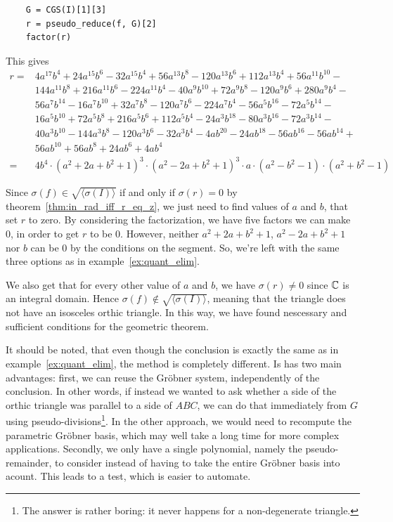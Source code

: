 \begin{example}
  \begin{verbatim}
    G = CGS(I)[1][3]
    r = pseudo_reduce(f, G)[2]
    factor(r)
  \end{verbatim}
  This gives
  \begin{align*}
    r = &4 a^{17} b^4 + 24 a^{15} b^6 - 32 a^{15} b^4 + 56 a^{13} b^8 - 120 a^{13} b^6 + 112 a^{13} b^4 + 56 a^{11} b^{10} - \\
        &144 a^{11} b^8 + 216 a^{11} b^6 - 224 a^{11} b^4 - 40 a^9 b^{10} + 72 a^9 b^8 - 120 a^9 b^6 + 280 a^9 b^4 - \\
        &56 a^7 b^{14} - 16 a^7 b^{10} + 32 a^7 b^8 - 120 a^7 b^6 - 224 a^7 b^4 - 56 a^5 b^{16} - 72 a^5 b^{14} - \\
        &16 a^5 b^{10} + 72 a^5 b^8 + 216 a^5 b^6 + 112 a^5 b^4 - 24 a^3 b^{18} - 80 a^3 b^{16} - 72 a^3 b^{14} - \\
        &40 a^3 b^{10} - 144 a^3 b^8 - 120 a^3 b^6 - 32 a^3 b^4 - 4 a b^{20} - 24 a b^{18} - 56 a b^{16} - 56 a b^{14} + \\
        &56 a b^{10} + 56 a b^8 + 24 a b^6 + 4 a b^4 \\
    = &4 b^{4}\cdot {(a^{2} + 2a + b^{2} + 1)}^{3} \cdot {(a^{2} - 2a + b^{2} + 1)}^{3} \cdot a \cdot (a^{2} - b^{2} - 1) \cdot (a^{2} + b^{2} - 1)
  \end{align*}

  Since $\sigma(f) \in \sqrt{\langle \sigma(I) \rangle}$ if and only if $\sigma(r) = 0$ by theorem~\ref{thm:in_rad_iff_r_eq_z}, we just need to find values of $a$ and $b$, that set $r$ to zero. By considering the factorization, we have five factors we can make 0, in order to get $r$ to be 0. However, neither $a^{2} + 2a + b^{2} + 1$, $a^{2} - 2a + b^{2} + 1$ nor $b$ can be $0$ by the conditions on the segment. So, we're left with the same three options as in example~\ref{ex:quant_elim}.

  We also get that for every other value of $a$ and $b$, we have $\sigma(r) \neq 0$ since $\mathbb{C}$ is an integral domain. Hence $\sigma(f) \notin \sqrt{\langle \sigma(I) \rangle}$, meaning that the triangle does not have an isosceles orthic triangle. In this way, we have found nescessary and sufficient conditions for the geometric theorem.
\end{example}

It should be noted, that even though the conclusion is exactly the same as in example~\ref{ex:quant_elim}, the method is completely different. Is has two main advantages: first, we can reuse the Gröbner system, independently of the conclusion. In other words, if instead we wanted to ask whether a side of the orthic triangle was parallel to a side of $ABC$, we can do that immediately from $G$ using pseudo-divisions\footnote{The answer is rather boring: it never happens for a non-degenerate triangle.}. In the other approach, we would need to recompute the parametric Gröbner basis, which may well take a long time for more complex applications. Secondly, we only have a single polynomial, namely the pseudo-remainder, to consider instead of having to take the entire Gröbner basis into acount. This leads to a test, which is easier to automate.

